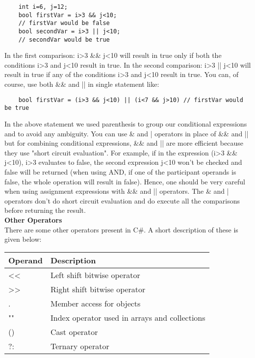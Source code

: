 \begin{lstlisting}
    int i=6, j=12;
    bool firstVar = i>3 && j<10;
    // firstVar would be false
    bool secondVar = i>3 || j<10;
    // secondVar would be true        
\end{lstlisting}

In the first comparison: i>3 \&\& j<10 will result in true only if both the conditions i>3 and j<10 result in true.
In the second comparison: i>3 || j<10 will result in true if any of the conditions i>3 and j<10 result in true. You
can, of course, use both \&\& and || in single statement like:

\begin{lstlisting}
    bool firstVar = (i>3 && j<10) || (i<7 && j>10) // firstVar would be true    
\end{lstlisting}


In the above statement we used parenthesis to group our conditional expressions and to avoid any ambiguity.
You can use \& and | operators in place of \&\& and || but for combining conditional expressions, \&\& and || are more
efficient because they use "short circuit evaluation". For example, if in the expression (i>3 \&\& j<10), i>3
evaluates to false, the second expression j<10 won’t be checked and false will be returned (when using AND, if one
of the participant operands is false, the whole operation will result in false). Hence, one should be very careful
when using assignment expressions with \&\& and || operators. The \& and | operators don’t do short circuit
evaluation and do execute all the comparisons before returning the result.\\


\textbf{Other Operators}\\
There are some other operators present in C\#. A short description of these is given below:

\begin{center}
    \begin{tabular}{ | m{5em} | m{10cm} | } 
    \hline
    Operand & Description \\
    \hline
    << & Left shift bitwise operator\\
    >> & Right shift bitwise operator\\
    . & Member access for objects\\
    "" & Index operator used in arrays and collections\\
    () & Cast operator\\
    ?: & Ternary operator\\
    \hline
    \end{tabular}
\end{center}

